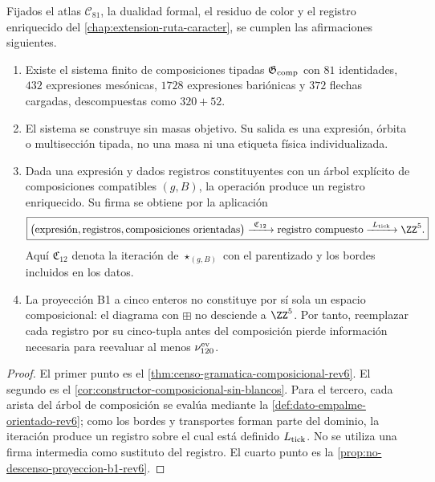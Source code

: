 \begin{theorem}
\label{thm:cierre-composicional-sin-blancos-rev6}
Fijados el atlas \(\mathcal C_{81}\), la dualidad formal, el residuo de color
y el registro enriquecido del \cref{chap:extension-ruta-caracter}, se cumplen
las afirmaciones siguientes.
\begin{enumerate}
 \item Existe el sistema finito de composiciones tipadas
 \(\mathfrak G_{\rm comp}\) con \(81\) identidades, \(432\) expresiones
 mesónicas, \(1728\) expresiones bariónicas y \(372\) flechas cargadas,
 descompuestas como \(320+52\).

 \item El sistema se construye sin masas objetivo. Su salida es una
 expresión, órbita o multisección tipada, no una masa ni una etiqueta física
 individualizada.

 \item Dada una expresión y dados registros constituyentes con un árbol
 explícito de composiciones compatibles \((g,B)\), la operación produce un
 registro enriquecido. Su firma se obtiene por la aplicación
 \[
 \boxed{
 \bigl(
 \text{expresión},
 \text{registros},
 \text{composiciones orientadas}
 \bigr)
 \xrightarrow{\ \mathfrak C_{12}\ }
 \text{registro compuesto}
 \xrightarrow{\ L_{\rm tick}\ }
 \ZZ^5.}
 \]
 Aquí \(\mathfrak C_{12}\) denota la iteración de
 \(\star_{(g,B)}\) con el parentizado y los bordes incluidos en los datos.

 \item La proyección B1 a cinco enteros no constituye por sí sola un espacio
 composicional: el diagrama con \(\boxplus\) no desciende a
 \(\ZZ^5\). Por tanto, reemplazar cada registro por su cinco-tupla antes del
 composición pierde información necesaria para reevaluar al menos
 \(\nu_{120}^{\rm ev}\).
\end{enumerate}
\end{theorem}

\begin{proof}
El primer punto es el
\cref{thm:censo-gramatica-composicional-rev6}. El segundo es el
\cref{cor:constructor-composicional-sin-blancos}. Para el tercero, cada
arista del árbol de composición se evalúa mediante la
\cref{def:dato-empalme-orientado-rev6}; como los bordes y transportes forman
parte del dominio, la iteración produce un registro sobre el cual está
definido \(L_{\rm tick}\). No se utiliza una firma intermedia como sustituto
del registro. El cuarto punto es la
\cref{prop:no-descenso-proyeccion-b1-rev6}.
\end{proof}

